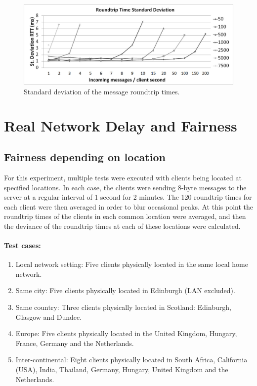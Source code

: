 \documentclass[12pt]{article}
\begin{document}
\begin{center}
\begin{figure}
\label{fig:broadcast_rtt_std}
\includegraphics[scale=0.32]{test_SERVER_RTTstd.jpg}
\caption{Standard deviation of the message roundtrip times.}
\end{figure}

\end{center}


\section{Real Network Delay and Fairness}

\subsection{Fairness depending on location}
For this experiment, multiple tests were executed with clients being located at specified locations. In each case, the clients were sending 8-byte messages to the server at a regular interval of 1 second for 2 minutes. The 120 roundtrip times for each client were then averaged in order to blur occasional peaks. At this point the roundtrip times of the clients in each common location were averaged, and then the deviance of the roundtrip times at each of these locations were calculated.

\paragraph{Test cases:}
\begin{enumerate}
\item Local network setting: Five clients physically located in the same local home network.

\item Same city: Five clients physically located in Edinburgh (LAN excluded).

\item Same country: Three clients physically located in Scotland: Edinburgh, Glasgow and Dundee.

\item Europe: Five clients physically located in the United Kingdom, Hungary, France, Germany and the Netherlands.

\item Inter-continental: Eight clients physically located in South Africa, California (USA), India, Thailand, Germany, Hungary, United Kingdom and the Netherlands.

\end{enumerate}
\end{document}
